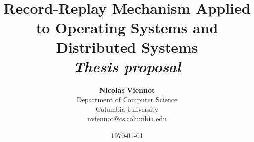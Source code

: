 \documentclass[12pt]{article}
\title{{\bf Record-Replay Mechanism Applied to Operating Systems and Distributed Systems} \\
\it Thesis proposal}
\author{ {\bf Nicolas Viennot}  \\
Department of Computer Science \\
Columbia University\\
{\small nviennot@cs.columbia.edu}
}
\date{\today}
\begin{document}
\pagestyle{plain}
\maketitle

\pagebreak


\pagebreak
\tableofcontents
\pagebreak

\cleardoublepage
{}








\pagebreak

\begin{footnotesize}


\end{footnotesize}
\end{document}
